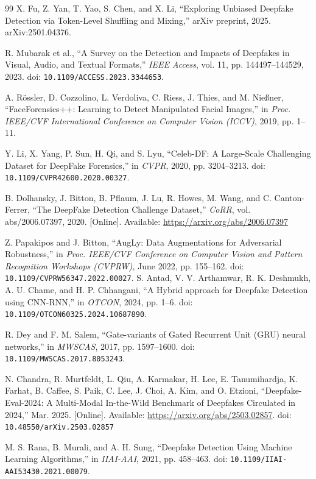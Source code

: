\documentclass[conference]{IEEEtran}
\begin{document}
\begin{thebibliography}{99}
X. Fu, Z. Yan, T. Yao, S. Chen, and X. Li, ``Exploring Unbiased Deepfake Detection via Token-Level Shuffling and Mixing,'' arXiv preprint, 2025. arXiv:2501.04376.

R. Mubarak et al., ``A Survey on the Detection and Impacts of Deepfakes in Visual, Audio, and Textual Formats,'' \textit{IEEE Access}, vol. 11, pp. 144497--144529, 2023. doi: \texttt{10.1109/ACCESS.2023.3344653}.



A. Rössler, D. Cozzolino, L. Verdoliva, C. Riess, J. Thies, and M. Nießner, 
``FaceForensics++: Learning to Detect Manipulated Facial Images,'' 
in \textit{Proc. IEEE/CVF International Conference on Computer Vision (ICCV)}, 2019, pp. 1--11.


Y. Li, X. Yang, P. Sun, H. Qi, and S. Lyu, ``Celeb-DF: A Large-Scale Challenging Dataset for DeepFake Forensics,'' in \textit{CVPR}, 2020, pp. 3204--3213. doi: \texttt{10.1109/CVPR42600.2020.00327}.

B. Dolhansky, J. Bitton, B. Pflaum, J. Lu, R. Howes, M. Wang, and C. Canton-Ferrer, 
``The DeepFake Detection Challenge Dataset,'' 
\textit{CoRR}, vol. abs/2006.07397, 2020. [Online]. Available: \url{https://arxiv.org/abs/2006.07397}




Z. Papakipos and J. Bitton, 
``AugLy: Data Augmentations for Adversarial Robustness,'' 
in \textit{Proc. IEEE/CVF Conference on Computer Vision and Pattern Recognition Workshops (CVPRW)}, 
June 2022, pp. 155--162. doi: \texttt{10.1109/CVPRW56347.2022.00027}.
S. Antad, V. V. Arthamwar, R. K. Deshmukh, A. U. Chame, and H. P. Chhangani, ``A Hybrid approach for Deepfake Detection using CNN-RNN,'' in \textit{OTCON}, 2024, pp. 1--6. doi: \texttt{10.1109/OTCON60325.2024.10687890}.

R. Dey and F. M. Salem, ``Gate-variants of Gated Recurrent Unit (GRU) neural networks,'' in \textit{MWSCAS}, 2017, pp. 1597--1600. doi: \texttt{10.1109/MWSCAS.2017.8053243}.


N. Chandra, R. Murtfeldt, L. Qiu, A. Karmakar, H. Lee, E. Tanumihardja, K. Farhat, B. Caffee, S. Paik, C. Lee, J. Choi, A. Kim, and O. Etzioni, 
``Deepfake-Eval-2024: A Multi-Modal In-the-Wild Benchmark of Deepfakes Circulated in 2024,'' 
Mar. 2025. [Online]. Available: \url{https://arxiv.org/abs/2503.02857}. doi: \texttt{10.48550/arXiv.2503.02857}


M. S. Rana, B. Murali, and A. H. Sung, ``Deepfake Detection Using Machine Learning Algorithms,'' in \textit{IIAI-AAI}, 2021, pp. 458--463. doi: \texttt{10.1109/IIAI-AAI53430.2021.00079}.



\end{thebibliography}
\end{document}
